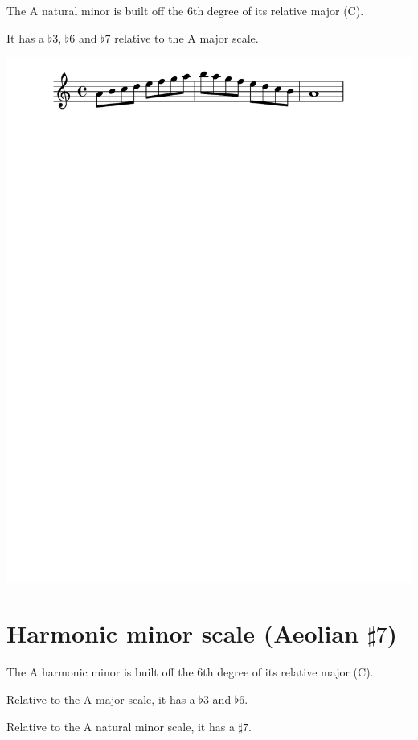 \documentclass[11pt]{article}
\begin{document}
The A natural minor is built off the 6th degree of its relative major (C).

It has a \(\flat{3}\), \(\flat{6}\)  and \(\flat{7}\)  relative to the A major scale.

\begin{center}
\includegraphics[width=.9\linewidth]{a_natural_minor.pdf}
\end{center}

\section*{Harmonic minor scale (Aeolian \(\sharp{7}\))}
\label{sec:orge4d675c}

The A harmonic minor is built off the 6th degree of its relative major (C).

Relative to the A major scale, it has a \(\flat{3}\) and \(\flat{6}\).

Relative to the A natural minor scale, it has a \(\sharp{7}\).
\end{document}
